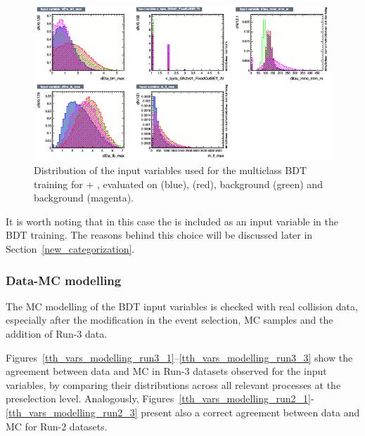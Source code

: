   \begin{figure}[htbp]
    \centering
    \includegraphics[width=0.95\linewidth]{images/plots_tH_tHqb_for_thesis/variables_id_c5.png}
    \caption{Distribution of the input variables used for the multiclass BDT training for \thtt + \ttHtt, evaluated on \ttHtt (blue), \thtt (red), \ztautau background (green) and \ttbar background (magenta).}
    \label{th_tth_vars_tmva_3}
\end{figure}

It is worth noting that in this case the \mmc is included as an input variable in the BDT training. The reasons behind this choice will be discussed later in Section~\ref{new_categorization}.

\subsubsection*{Data-MC modelling}

The MC modelling of the BDT input variables is checked with real collision data, especially after the modification in the event selection, MC samples and the addition of Run-3 data.

Figures~\ref{tth_vars_modelling_run3_1}–\ref{tth_vars_modelling_run3_3} show the agreement between data and MC in Run-3 datasets observed for the input variables, by comparing their distributions across all relevant processes at the preselection level. Analogously, Figures~\ref{tth_vars_modelling_run2_1}-\ref{tth_vars_modelling_run2_3} present also a correct agreement between data and MC for Run-2 datasets.

